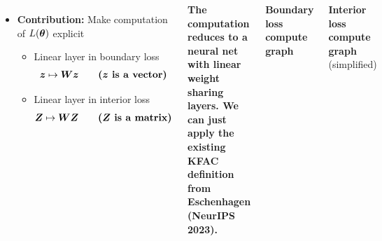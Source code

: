 \documentclass[a0paper]{tikzposter}
\begin{document}
\begin{columns}
{\begin{minipage}{0.3\linewidth}
\begin{itemize}
        \vspace{0.7ex}

      \item \textbf{Contribution:} Make computation of $L({\bm{\theta}})$ explicit
        \begin{itemize}
        \item Linear layer in boundary loss
          \begin{align*}
            {\bm{z}} \mapsto {\bm{W}} {\bm{z}} \qquad \textbf{(${\bm{z}}$ is a vector)}
          \end{align*}
        \item Linear layer in interior loss
          \begin{align*}
            {\bm{Z}} \mapsto {\bm{W}} {\bm{Z}} \qquad \textbf{(${\bm{Z}}$ is a matrix)}
          \end{align*}
        \end{itemize}
      \end{itemize}

      \vspace{2ex}

      \textbf{The computation reduces to a neural net with linear weight sharing layers.
        We can just apply the existing KFAC definition from Eschenhagen (NeurIPS 2023).}
    \end{minipage}
    \hfill
    \begin{minipage}{0.68\linewidth}
      \centering
      \hspace{-13.25ex}

      \textbf{Boundary loss compute graph}

      \vspace{2ex}

      

      \textbf{Interior loss compute graph} (simplified)

    \end{minipage}
  }
\end{columns}
\end{document}
